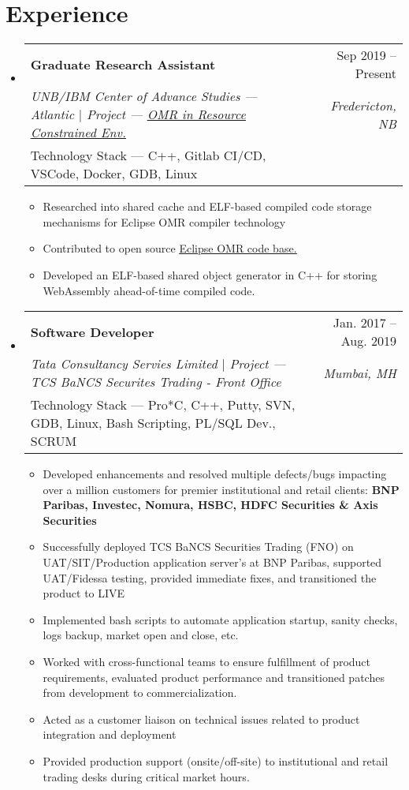 \documentclass[letterpaper,10pt]{article}
\makeatletter
\newcommand{\resumeItem}[1]{
  \item\small{
    {#1 \vspace{-2pt}}
  }
}
\newcommand{\resumeSubProjheading}[5]{
  \vspace{-2pt}\item
    \begin{tabular*}{0.97\textwidth}[t]{l@{\extracolsep{\fill}}r}
      \textbf{#1} & #2 \\
      \textit{\small#3} & \textit{\small #4} \\
      {\small#5} \\
    \end{tabular*}\vspace{-7pt}
}
\newcommand{\resumeSubSubheading}[2]{
    \item
    \begin{tabular*}{0.97\textwidth}{l@{\extracolsep{\fill}}r}
      \textit{\small#1} & \textit{\small #2} \\
    \end{tabular*}\vspace{-7pt}
}
\newcommand{\resumeSubHeadingListStart}{\begin{itemize}[leftmargin=0.15in, label={}]}
\newcommand{\resumeSubHeadingListEnd}{\end{itemize}}
\newcommand{\resumeItemListStart}{\begin{itemize}}
\newcommand{\resumeItemListEnd}{\end{itemize}\vspace{-5pt}}
\makeatother
\begin{document}
\section{Experience}
  \resumeSubHeadingListStart

    \resumeSubProjheading
      {Graduate Research Assistant }{Sep 2019 -- Present}
      {UNB/IBM Center of Advance Studies --- Atlantic $|$ Project --- \href{https://www-01.ibm.com/ibm/cas/canada/projects?projectId=1036}{\underline{OMR in Resource Constrained Env.}} }{Fredericton, NB}
      {Technology Stack --- C++, Gitlab CI/CD, VSCode, Docker, GDB, Linux}
      \resumeItemListStart
        \resumeItem{Researched into shared cache and ELF-based compiled code storage mechanisms for Eclipse OMR compiler technology}
        \resumeItem{Contributed to open source \href{https://github.com/eclipse/omr}{\underline{Eclipse OMR code base.}}}
        \resumeItem{Developed an ELF-based shared object generator in C++ for storing WebAssembly ahead-of-time compiled code.}
      \resumeItemListEnd
      

    \resumeSubProjheading
      {Software Developer}{Jan. 2017 -- Aug. 2019}
      {Tata Consultancy Servies Limited $|$ Project --- TCS BaNCS Securites Trading - Front Office }{Mumbai, MH} 
      {Technology Stack --- Pro*C, C++, Putty, SVN, GDB, Linux, Bash Scripting, PL/SQL Dev., SCRUM}
      \resumeItemListStart
      \resumeItem{Developed enhancements and resolved multiple defects/bugs impacting over a million customers for premier institutional and retail clients: \textbf{BNP Paribas, Investec, Nomura, HSBC, HDFC Securities \& Axis Securities}}
      \resumeItem{Successfully deployed TCS BaNCS Securities Trading (FNO) on UAT/SIT/Production application server's at BNP Paribas, supported UAT/Fidessa testing, provided immediate fixes, and transitioned the product to LIVE}       
      \resumeItem{Implemented bash scripts to automate application startup, sanity checks, logs backup, market open and close, etc.}
      \resumeItem{Worked with cross-functional teams to ensure fulfillment of product requirements, evaluated product performance and transitioned patches from development to commercialization.}  
      \resumeItem{Acted as a customer liaison on technical issues related to product integration and deployment}
      \resumeItem{Provided production support (onsite/off-site) to institutional and retail trading desks during critical market hours.}
      \resumeItemListEnd
  \resumeSubHeadingListEnd
\end{document}
